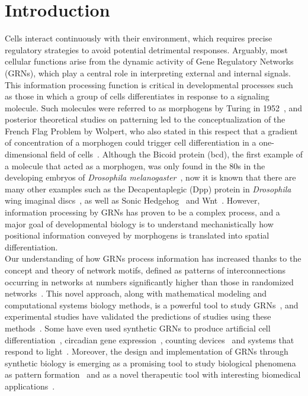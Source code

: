 \documentclass[10pt,letterpaper]{article}
\begin{document}
\linenumbers

\section*{Introduction}

Cells interact continuously with their environment, which requires precise
regulatory strategies to avoid potential detrimental responses. Arguably, most
cellular functions arise from the dynamic activity of Gene Regulatory Networks
(GRNs), which play a central role in interpreting external and internal
signals. This information processing function is critical in
developmental processes such as those in which a group of cells differentiates in
response to a signaling molecule. Such molecules were referred to as morphogens by Turing in
1952~\cite{Turing1952}, and posterior theoretical studies on patterning led to the
conceptualization of the French Flag Problem by Wolpert, who also stated
in this respect that a gradient of concentration of a morphogen could
trigger cell differentiation in a one-dimensional field of cells~\cite{Wolpert1969,
sharpe_2019}.
Although the Bicoid protein (bcd), the first example of a molecule that acted
as a morphogen, was only found in the 80s in the developing embryos of
\textit{Drosophila melanogaster}~\cite{driever_gradient_1988,
driever_bicoid_1988}, now it is known that there
are many other examples such as the Decapentaplegic (Dpp) protein in
\textit{Drosophila} wing imaginal discs~\cite{affolter_decapentaplegic_2007},
as well as Sonic Hedgehog~\cite{dessaud_dynamic_2010,cohen_theoretical_2014}
and Wnt~\cite{raspopovic_digit_2014}. However, information processing by GRNs
has proven to be a complex process, and a major goal of developmental biology
is to understand mechanistically how positional information conveyed by morphogens
is translated into spatial differentiation.\\

Our understanding of how GRNs process information has increased thanks to the
concept and theory of network motifs, defined as patterns of
interconnections occurring in networks at numbers significantly higher
than those in randomized networks~\cite{Milo2002}. This novel approach, along
with mathematical modeling and computational systems biology methods, is a
powerful tool to study GRNs~\cite{kitano_computational_2002}, and
experimental studies have validated the predictions of studies using these
methods~\cite{Kalir2005,Kalir2004,Mangan2003a,ODonnell2005}.
Some have even used synthetic GRNs to produce artificial cell
differentiation~\cite{Basu2005}, circadian gene
expression~\cite{atkinson_development_2003}, counting
devices~\cite{friedland_synthetic_2009} and systems that respond to
light~\cite{gardner2012,levskaya2005}.
Moreover, the design and implementation of GRNs through synthetic biology is
emerging as a promising tool to study biological phenomena as pattern
formation~\cite{santos-moreno_using_2019} and as a novel therapeutic tool with
interesting biomedical applications~\cite{karlsson_therapeutic_2012,
higashikuni_advancing_2017,abil_synthetic_2015,healy_genetic_2019,
kitada_programming_2018}.
\end{document}
